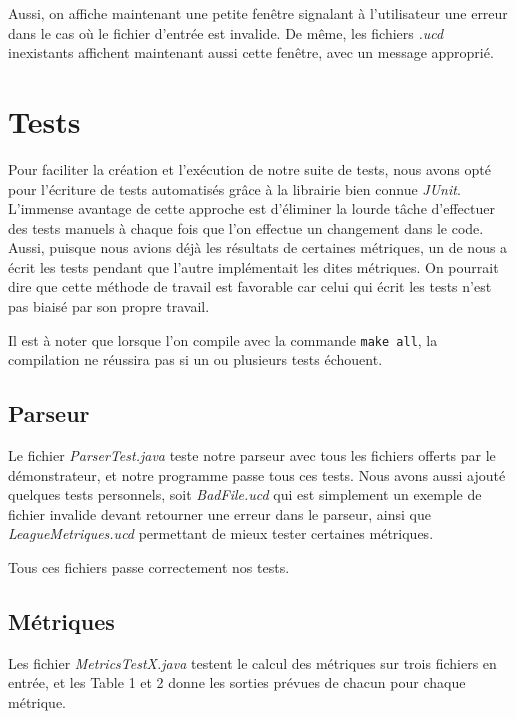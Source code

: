 \documentclass[letter,french]{report}
\begin{document}
  Aussi, on affiche
  maintenant une petite fenêtre signalant à l'utilisateur une erreur dans
  le cas où le fichier d'entrée est invalide. De même, les fichiers
  \emph{.ucd} inexistants affichent maintenant aussi cette fenêtre, avec un message
  approprié.
	

	\section*{Tests}
  Pour faciliter la création et l'exécution de notre suite de tests, nous avons opté pour
  l'écriture de tests automatisés grâce à la librairie bien connue \emph{JUnit}.
  L'immense avantage de cette approche est d'éliminer la lourde tâche
  d'effectuer des tests manuels à chaque fois que l'on effectue un changement
  dans le code. Aussi, puisque nous avions déjà les résultats de certaines
  métriques, un de nous a écrit les tests pendant que l'autre implémentait les
  dites métriques. On pourrait dire que cette méthode de travail est favorable
  car celui qui écrit les tests n'est pas biaisé par son propre travail.

  Il est à noter que lorsque l'on compile avec la commande \texttt{make all}, la
  compilation ne réussira pas si un ou plusieurs tests échouent. 

  \subsection*{Parseur}
  Le fichier \emph{ParserTest.java} teste notre parseur avec tous les fichiers
  offerts par le démonstrateur, et notre programme passe tous ces tests. Nous
  avons aussi ajouté quelques tests personnels, soit \emph{BadFile.ucd} qui est
  simplement un exemple de fichier invalide devant retourner une erreur dans le
  parseur, ainsi que \emph{LeagueMetriques.ucd} permettant de mieux tester
  certaines métriques.

  Tous ces fichiers passe correctement nos tests.

  \subsection*{Métriques}
  Les fichier \emph{MetricsTestX.java} testent le calcul des métriques sur trois
  fichiers en entrée, et les Table 1 et 2 donne les sorties prévues de chacun pour
  chaque métrique.
 
\end{document}
